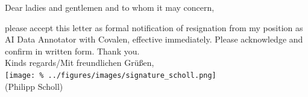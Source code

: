 \documentclass[
  fontsize=11pt,
  paper=a4,
  parskip=half,
  enlargefirstpage=on,    %
  fromalign=right,        %
  fromphone=on,           %
  fromrule=aftername,     %
  addrfield=off,           %
  backaddress=off,         %
  subject=beforeopening,  %
  locfield=narrow,        %
  foldmarks=on,           %
]{scrlttr2}
\begin{document}
\begin{letter}{}
  \opening{Dear ladies and gentlemen and to whom it may concern,}

  please accept this letter as formal notification of resignation from my position as AI Data Annotator with Covalen, effective immediately. Please acknowledge and confirm in written form. Thank you.\\%

  Kinds regards/Mit freundlichen Grüßen,\\%
  \texttt{[image: \%
    ../figures/images/signature\_scholl.png]}\\[-0.7cm]%
  (Philipp Scholl)%
\end{letter}
\end{document}
